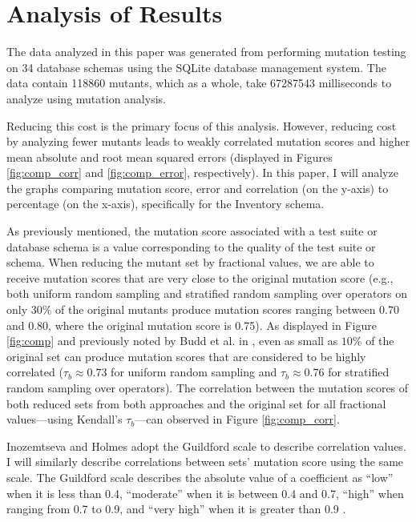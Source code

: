 \documentclass[conference]{IEEEtran}
\begin{document}
\vspace*{-0.25cm}
\section{Analysis of Results}
The data analyzed in this paper was generated from performing mutation testing on
34 database schemas using the SQLite database management system. The data
contain 118860 mutants, which as a whole, take 67287543 milliseconds to analyze using mutation analysis.

Reducing this cost is the primary focus of this analysis. However, reducing cost by analyzing fewer mutants
leads to weakly correlated mutation scores and higher mean absolute and root mean squared errors (displayed
in Figures \ref{fig:comp_corr} and \ref{fig:comp_error}, respectively). In this paper, I will
analyze the graphs comparing mutation score, error and correlation (on the y-axis) to percentage (on the x-axis),
specifically for the Inventory schema.

As previously mentioned, the mutation score associated with a test suite or database schema is a value
corresponding to the quality of the test suite or schema. When reducing the mutant set by fractional values,
we are able to receive mutation scores that are very close to the original mutation score (e.g., both uniform random sampling
and stratified random sampling over operators on only $30\%$ of the original mutants produce mutation scores ranging between 0.70 and 0.80, where the
original mutation score is 0.75). As displayed
in Figure \ref{fig:comp} and previously noted by Budd et al. in \cite{budd1980mutation}, even as small
as $10\%$ of the original set can produce mutation scores that are considered to be highly correlated
($\tau_b \approx 0.73$ for uniform random sampling and $\tau_b \approx 0.76$ for stratified random sampling over operators).
The correlation between the mutation scores of both reduced sets from both approaches and the original set for all fractional values---using Kendall's $\tau_b$---can
observed in Figure \ref{fig:comp_corr}.

Inozemtseva and Holmes adopt the Guildford scale to describe correlation values. I will similarly
describe correlations between sets' mutation score using the same scale.
The Guildford scale describes the absolute value of a coefficient as ``low'' when it is less than 0.4,
``moderate'' when it is between 0.4 and 0.7, ``high'' when ranging from 0.7 to 0.9, and ``very high''
when it is greater than 0.9 \cite{inozemtseva2014coverage}.
\end{document}
